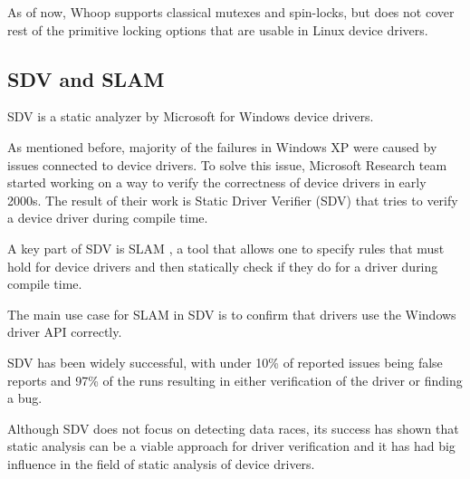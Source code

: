 \documentclass[..thesis.tex]{subfiles}
\begin{document}
As of now, Whoop supports classical mutexes and spin-locks, but does not cover rest of the primitive locking options that are usable in Linux device drivers. 






\subsection{SDV and SLAM}

SDV is a static analyzer by Microsoft for Windows device drivers.

As mentioned before, majority of the failures in Windows XP were caused by issues connected to device drivers. To solve this issue, Microsoft Research team started working on a way to verify the correctness of device drivers in early 2000s. The result of their work is Static Driver Verifier (SDV) that tries to verify a device driver during compile time. 

A key part of SDV is SLAM \cite{ball_decade_2011}, a tool that allows one to specify rules that must hold for device drivers and then statically check if they do for a driver during compile time. 

The main use case for SLAM in SDV is to confirm that drivers use the Windows driver API correctly.
 
SDV has been widely successful, with under 10\%  of reported issues being false reports \cite[74]{ball_decade_2011} and 97\% of the runs resulting in either verification of the driver or finding a bug.

Although SDV does not focus on detecting data races, its success has shown that static analysis can be a viable approach for driver verification and it has had big influence in the field of static analysis of device drivers.

\end{document}
